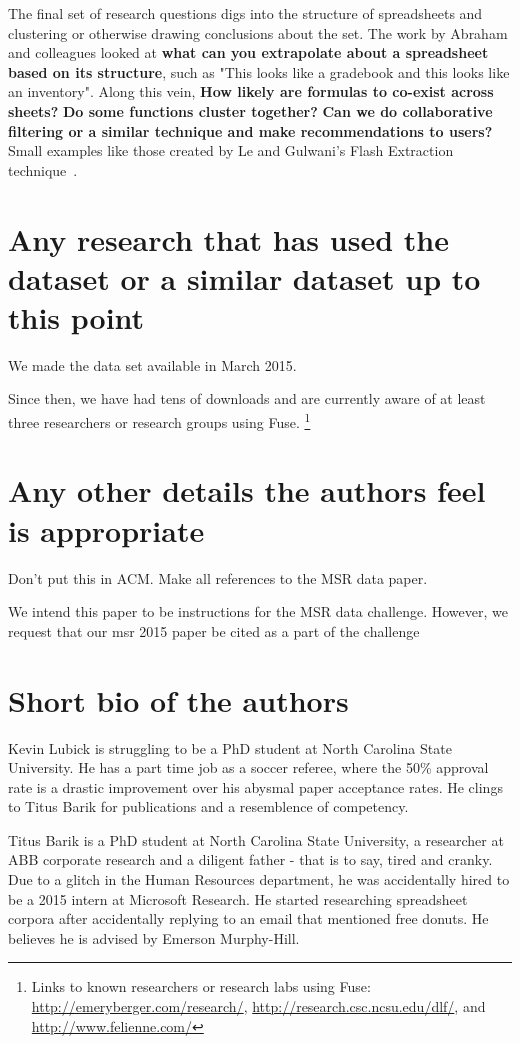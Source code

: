 \documentclass[conference]{IEEEtran}
\begin{document}
The final set of research questions digs into the structure of spreadsheets and clustering or otherwise drawing conclusions about the set.
The work by Abraham and colleagues \cite{Abraham2006} looked at \textbf{what can you extrapolate about a spreadsheet based on its structure}, such as "This looks like a gradebook and this looks like an inventory".
Along this vein, \textbf{How likely are formulas to co-exist across sheets?} 
\textbf{Do some functions cluster together? }
\textbf{Can we do collaborative filtering or a similar technique and make recommendations to users? }
Small examples like those created by Le and Gulwani's Flash Extraction technique~\cite{le2014}.  


\section{Any research that has used the dataset or a similar dataset up to this point}
We made the data set available in March 2015.  

Since then, we have had tens of downloads and are currently aware of at least three researchers or research groups using Fuse.  
\footnote{Links to known researchers or research labs using Fuse: \url{http://emeryberger.com/research/}, \url{http://research.csc.ncsu.edu/dlf/}, and \url{http://www.felienne.com/}}



\section{Any other details the authors feel is appropriate}
Don't put this in ACM.  Make all references to the MSR data paper.

We intend this paper to be instructions for the MSR data challenge.  
However, we request that our msr 2015 paper be cited as a part of the challenge
\section{Short bio of the authors}

Kevin Lubick is struggling to be a PhD student at North Carolina State University.  He has a part time job as a soccer referee, where the 50\% approval rate is a drastic improvement over his abysmal paper acceptance rates.  He clings to Titus Barik for publications and a resemblence of competency.

Titus Barik is a PhD student at North Carolina State University, a researcher at ABB corporate research and a diligent father - that is to say, tired and cranky.  Due to a glitch in the Human Resources department, he was accidentally hired to be a 2015 intern at Microsoft Research.  He started researching spreadsheet corpora after accidentally replying to an email that mentioned free donuts.  He believes he is advised by Emerson Murphy-Hill.
\end{document}
